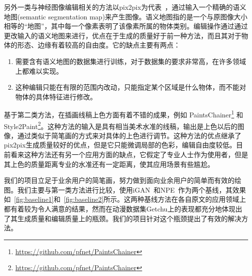 \documentclass[a4paper,12pt,UTF8]{ctexart}
\begin{document}
另外一类与神经图像编辑相关的方法以pix2pix为代表~\cite{isola2016image}，通过输入一个精确的语义地图(semantic segmentation map)来产生图像。语义地图指的是一个与原图像大小相等的“地图”，其中每一个像素表明了该像素所属的物体类别。编辑操作通过通过更改输入的语义地图来进行，优点在于生成的质量好于前一种方法，而且其对于物体的形态、边缘有着较高的自由度。它的缺点主要有两点：
\begin{enumerate}
  \item 需要含有语义地图的数据集进行训练，对于数据集的要求非常高，在许多领域上都难以实现。
  \item 这种编辑只能在有限的范围内改动，只能指定某个区域是什么物体，而不能对物体的具体特征进行修改。
\end{enumerate}

基于第二类方法，在插画线稿上色方面有着不错的成果，例如 PaintsChainer\footnote{\url{https://github.com/pfnet/PaintsChainer}} 和 Style2Paint\footnote{\url{https://github.com/pfnet/PaintsChainer}}。这种方法的输入是具有相当美术水准的线稿，输出是上色以后的图像，通过类似于简笔画的方式来对具体的上色进行调节。这种方法的优点继承了pix2pix生成质量较好的优点，但是它只能微调局部的色彩，编辑自由度较低。目前看来这种方法还有另一个应用方面的缺点，它假定了专业人士作为使用者，但是其上色的质量距离专业的水准还有一定距离，使其应用场景有些尴尬。

我们的项目立足于业余用户的简笔画，努力做到面向业余用户的简单而有效的绘图。我们主要与第一类方法进行比较，使用iGAN~\cite{Zhu2016Generative}和NPE~\cite{Brock2016Neural}作为两个基线，其效果如~\ref{fig:baseline1}和~\ref{fig:baseline2}所示。这两种基线方法在各自原文的应用领域上都有着较为令人满意的结果，然而在动漫数据集Getchu上的表现都充分地体现出了其生成质量和编辑质量上的瓶颈。我们的项目针对这个瓶颈提出了有效的解决方法。
\end{document}
